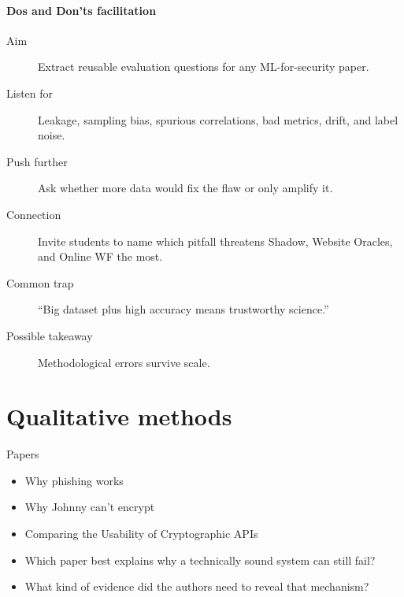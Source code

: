 \paragraph{Dos and Don'ts facilitation}
\begin{description}
  \item[Aim] Extract reusable evaluation questions for any ML-for-security
    paper.
  \item[Listen for] Leakage, sampling bias, spurious correlations, bad metrics,
    drift, and label noise.
  \item[Push further] Ask whether more data would fix the flaw or only amplify
    it.
  \item[Connection] Invite students to name which pitfall threatens Shadow,
    Website Oracles, and Online WF the most.
  \item[Common trap] \enquote{Big dataset plus high accuracy means trustworthy
    science.}
  \item[Possible takeaway] Methodological errors survive scale.
\end{description}


\section{Qualitative methods}

\begin{frame}
  \begin{block}{Papers}
    \begin{itemize}
      \item Why phishing works
      \item Why Johnny can't encrypt
      \item Comparing the Usability of Cryptographic APIs
    \end{itemize}
  \end{block}

  \begin{question}
    \begin{itemize}
      \item Which paper best explains why a technically sound system can still
        fail?
      \item What kind of evidence did the authors need to reveal that
        mechanism?
    \end{itemize}
  \end{question}
\end{frame}


